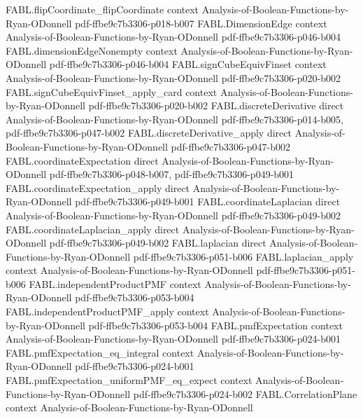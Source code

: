 \begin{theorem}
\proofstep
  {FABL.flipCoordinate_flipCoordinate}
  {context}
  {Analysis-of-Boolean-Functions-by-Ryan-ODonnell}
  {pdf-ffbe9c7b3306-p018-b007}
\proofstep
  {FABL.DimensionEdge}
  {context}
  {Analysis-of-Boolean-Functions-by-Ryan-ODonnell}
  {pdf-ffbe9c7b3306-p046-b004}
\proofstep
  {FABL.dimensionEdgeNonempty}
  {context}
  {Analysis-of-Boolean-Functions-by-Ryan-ODonnell}
  {pdf-ffbe9c7b3306-p046-b004}
\proofstep
  {FABL.signCubeEquivFinset}
  {context}
  {Analysis-of-Boolean-Functions-by-Ryan-ODonnell}
  {pdf-ffbe9c7b3306-p020-b002}
\proofstep
  {FABL.signCubeEquivFinset_apply_card}
  {context}
  {Analysis-of-Boolean-Functions-by-Ryan-ODonnell}
  {pdf-ffbe9c7b3306-p020-b002}
\proofstep
  {FABL.discreteDerivative}
  {direct}
  {Analysis-of-Boolean-Functions-by-Ryan-ODonnell}
  {pdf-ffbe9c7b3306-p014-b005,
    pdf-ffbe9c7b3306-p047-b002}
\proofstep
  {FABL.discreteDerivative_apply}
  {direct}
  {Analysis-of-Boolean-Functions-by-Ryan-ODonnell}
  {pdf-ffbe9c7b3306-p047-b002}
\proofstep
  {FABL.coordinateExpectation}
  {direct}
  {Analysis-of-Boolean-Functions-by-Ryan-ODonnell}
  {pdf-ffbe9c7b3306-p048-b007,
    pdf-ffbe9c7b3306-p049-b001}
\proofstep
  {FABL.coordinateExpectation_apply}
  {direct}
  {Analysis-of-Boolean-Functions-by-Ryan-ODonnell}
  {pdf-ffbe9c7b3306-p049-b001}
\proofstep
  {FABL.coordinateLaplacian}
  {direct}
  {Analysis-of-Boolean-Functions-by-Ryan-ODonnell}
  {pdf-ffbe9c7b3306-p049-b002}
\proofstep
  {FABL.coordinateLaplacian_apply}
  {direct}
  {Analysis-of-Boolean-Functions-by-Ryan-ODonnell}
  {pdf-ffbe9c7b3306-p049-b002}
\proofstep
  {FABL.laplacian}
  {direct}
  {Analysis-of-Boolean-Functions-by-Ryan-ODonnell}
  {pdf-ffbe9c7b3306-p051-b006}
\proofstep
  {FABL.laplacian_apply}
  {context}
  {Analysis-of-Boolean-Functions-by-Ryan-ODonnell}
  {pdf-ffbe9c7b3306-p051-b006}
\proofstep
  {FABL.independentProductPMF}
  {context}
  {Analysis-of-Boolean-Functions-by-Ryan-ODonnell}
  {pdf-ffbe9c7b3306-p053-b004}
\proofstep
  {FABL.independentProductPMF_apply}
  {context}
  {Analysis-of-Boolean-Functions-by-Ryan-ODonnell}
  {pdf-ffbe9c7b3306-p053-b004}
\proofstep
  {FABL.pmfExpectation}
  {context}
  {Analysis-of-Boolean-Functions-by-Ryan-ODonnell}
  {pdf-ffbe9c7b3306-p024-b001}
\proofstep
  {FABL.pmfExpectation_eq_integral}
  {context}
  {Analysis-of-Boolean-Functions-by-Ryan-ODonnell}
  {pdf-ffbe9c7b3306-p024-b001}
\proofstep
  {FABL.pmfExpectation_uniformPMF_eq_expect}
  {context}
  {Analysis-of-Boolean-Functions-by-Ryan-ODonnell}
  {pdf-ffbe9c7b3306-p024-b002}
\proofstep
  {FABL.CorrelationPlane}
  {context}
  {Analysis-of-Boolean-Functions-by-Ryan-ODonnell}

\end{theorem}
